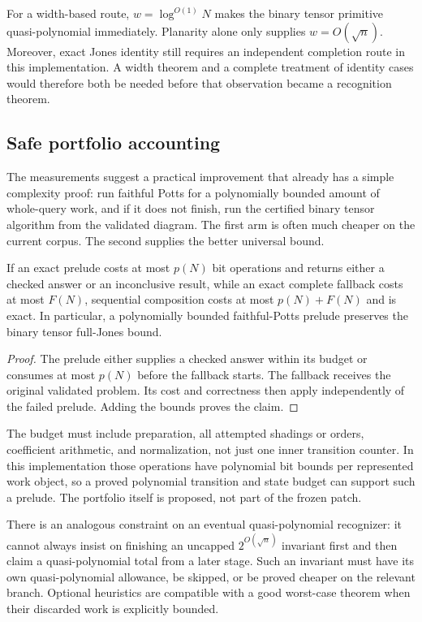 For a width-based route, $w=\log^{O(1)}N$ makes the binary tensor primitive
quasi-polynomial immediately. Planarity alone only supplies $w=O(\sqrt n)$.
Moreover, exact Jones identity still requires an independent completion
route in this implementation. A width theorem and a complete treatment of
identity cases would therefore both be needed before that observation became
a recognition theorem.

\subsection{Safe portfolio accounting}

The measurements suggest a practical improvement that already has a simple
complexity proof: run faithful Potts for a polynomially bounded amount of
whole-query work, and if it does not finish, run the certified binary tensor
algorithm from the validated diagram. The first arm is often much cheaper
on the current corpus. The second supplies the better universal bound.

\begin{proposition}
If an exact prelude costs at most $p(N)$ bit operations and returns either
a checked answer or an inconclusive result, while an exact complete fallback
costs at most $F(N)$, sequential composition costs at most $p(N)+F(N)$ and
is exact. In particular, a polynomially bounded faithful-Potts prelude
preserves the binary tensor full-Jones bound.
\end{proposition}
\begin{proof}
The prelude either supplies a checked answer within its budget or consumes
at most $p(N)$ before the fallback starts. The fallback receives the original
validated problem. Its cost and correctness then apply independently of the
failed prelude. Adding the bounds proves the claim.
\end{proof}

The budget must include preparation, all attempted shadings or orders,
coefficient arithmetic, and normalization, not just one inner transition
counter. In this implementation those operations have polynomial bit bounds
per represented work object, so a proved polynomial transition and state
budget can support such a prelude. The portfolio itself is proposed, not
part of the frozen patch.

There is an analogous constraint on an eventual quasi-polynomial recognizer:
it cannot always insist on finishing an uncapped $2^{O(\sqrt n)}$ invariant
first and then claim a quasi-polynomial total from a later stage. Such an
invariant must have its own quasi-polynomial allowance, be skipped, or be
proved cheaper on the relevant branch. Optional heuristics are compatible
with a good worst-case theorem when their discarded work is explicitly
bounded.

